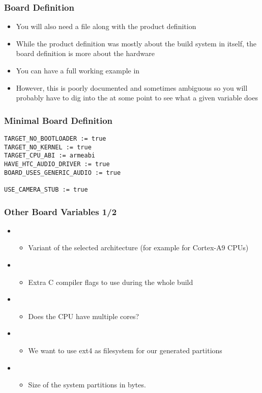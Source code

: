 \begin{frame}
  \frametitle{Board Definition}
  \begin{itemize}
  \item You will also need a  file along with the
    product definition
  \item While the product definition was mostly about the build system
    in itself, the board definition is more about the hardware
  \item You can have a full working example in
  \item However, this is poorly documented and sometimes ambiguous so
    you will probably have to dig into the 
    at some point to see what a given variable does
  \end{itemize}
\end{frame}

\begin{frame}[fragile]
  \frametitle{Minimal Board Definition}
\begin{verbatim}
TARGET_NO_BOOTLOADER := true
TARGET_NO_KERNEL := true
TARGET_CPU_ABI := armeabi
HAVE_HTC_AUDIO_DRIVER := true
BOARD_USES_GENERIC_AUDIO := true

USE_CAMERA_STUB := true
\end{verbatim}
\end{frame}

\begin{frame}
  \frametitle{Other Board Variables 1/2}
  \begin{itemize}
  \item {}
    \begin{itemize}
    \item Variant of the selected architecture (for example
       for Cortex-A9 CPUs)
    \end{itemize}
  \item {}
    \begin{itemize}
    \item Extra C compiler flags to use during the whole build
    \end{itemize}
  \item {}
    \begin{itemize}
    \item Does the CPU have multiple cores?
    \end{itemize}
  \item {}
    \begin{itemize}
    \item We want to use ext4 as filesystem for our generated
      partitions
    \end{itemize}
  \item {}
    \begin{itemize}
    \item Size of the system partitions in bytes.
    \end{itemize}
  \end{itemize}
\end{frame}

